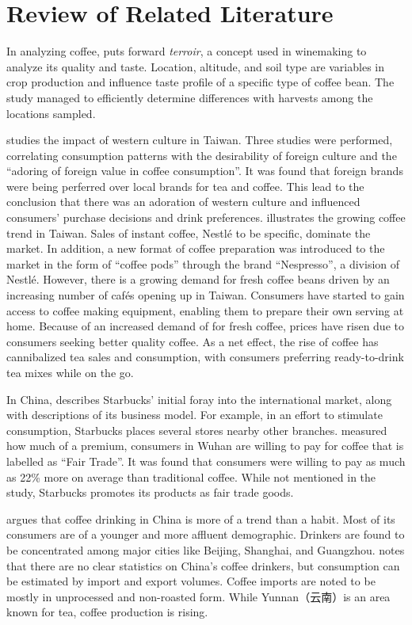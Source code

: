 \section{Review of Related Literature}\label{sec:rrl}

In analyzing coffee, \autocite{silva_characterization_2014} puts forward
\emph{terroir}, a concept used in winemaking to analyze its quality and taste.
Location, altitude, and soil type are variables in crop production and influence
taste profile of a specific type of coffee bean. The study managed to
efficiently determine differences with harvests among the locations sampled.

\autocite{su_impact_2006} studies the impact of western culture in Taiwan. Three
studies were performed, correlating consumption patterns with the desirability
of foreign culture and the ``adoring of foreign value in coffee consumption''.
It was found that foreign brands were being perferred over local brands for tea
and coffee. This lead to the conclusion that there was an adoration of western
culture and influenced consumers' purchase decisions and drink preferences.
\autocite{euromonitor_international_coffee_2015} illustrates the growing coffee
trend in Taiwan. Sales of instant coffee, Nestlé to be specific, dominate the
market. In addition, a new format of coffee preparation was introduced to the
market in the form of ``coffee pods'' through the brand ``Nespresso'', a
division of Nestlé. However, there is a growing demand for fresh coffee beans
driven by an increasing number of cafés opening up in Taiwan. Consumers have
started to gain access to coffee making equipment, enabling them to prepare
their own serving at home. Because of an increased demand of for fresh coffee,
prices have risen due to consumers seeking better quality coffee. As a net
effect, the rise of coffee has cannibalized tea sales and consumption, with
consumers preferring ready-to-drink tea mixes while on the go.

In China, \autocite{harrison_exporting_2005} describes Starbucks' initial foray
into the international market, along with descriptions of its business model.
For example, in an effort to stimulate consumption, Starbucks places several
stores nearby other branches. \autocite{yang_consumer_2012} measured how much of
a premium, consumers in Wuhan are willing to pay for coffee that is labelled as
``Fair Trade''. It was found that consumers were willing to pay as much as 22\%
more on average than traditional coffee. While not mentioned in the study,
Starbucks promotes its products as fair trade goods.

\autocite{zhang_coffee_2014} argues that coffee drinking in China is more of a
trend than a habit. Most of its consumers are of a younger and more affluent
demographic. Drinkers are found to be concentrated among major cities like
Beijing, Shanghai, and Guangzhou.
\autocite{international_coffee_council_coffee_2015} notes that there are no
clear statistics on China's coffee drinkers, but consumption can be estimated by
import and export volumes. Coffee imports are noted to be mostly in unprocessed
and non-roasted form. While Yunnan（云南）is an area known for tea, coffee
production is rising.
